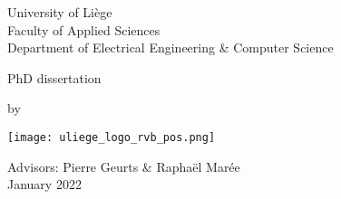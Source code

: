 \makeatletter


\begin{titlepage}

  \begin{center}
    {\Large University of Liège} \\
    \vspace{10pt}
    Faculty of Applied Sciences \\
    Department of Electrical Engineering \& Computer Science

    \vfill 

    PhD dissertation 

    \vspace{2em}

    {
      \color{primary}
      \rm
      \bf
      \Huge
      \@title
    }

    \vspace{1em}

    by \@author

    \vfill


    \begin{minipage}{0.4\linewidth}
      \texttt{[image: uliege\_logo\_rvb\_pos.png]}
    \end{minipage}
    \begin{minipage}{0.55\linewidth}
      \begin{flushright}
        Advisors: Pierre Geurts \& Raphaël Marée \\
        January 2022
      \end{flushright}
    \end{minipage}

  \end{center}
\end{titlepage}

\restoregeometry 

\makeatother

